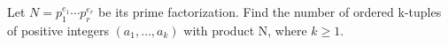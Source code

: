 Let $N=p_1^{e_1}\cdots p_r^{e_r}$ be its prime factorization. Find the number of ordered k-tuples of positive integers $(a_1,\ldots,a_k)$ with product N, where $k\ge 1$.
